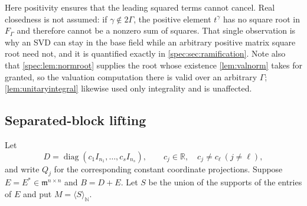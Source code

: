 \documentclass[11pt,a4paper]{article}
\numberwithin{equation}{section}
\theoremstyle{definition}
\theoremstyle{remark}
\newcommand{\R}{\mathbb R}
\newcommand{\N}{\mathbb N}
\newcommand{\mm}{\mathfrak m}
\newcommand{\diag}{\operatorname{diag}}
\begin{document}
Here positivity ensures that the leading squared terms cannot cancel.
Real closedness is not assumed: if $\gamma\notin2\Gamma$, the positive
element $t^\gamma$ has no square root in $F_\Gamma$ and therefore cannot be
a nonzero sum of squares. That single observation is why an SVD can stay in
the base field while an arbitrary positive matrix square root need not, and
it is quantified exactly in \cref{spec:sec:ramification}. Note also that
\cref{spec:lem:normroot} supplies the root whose existence
\cref{lem:valnorm} takes for granted, so the valuation computation there is
valid over an arbitrary $\Gamma$; \cref{lem:unitaryintegral} likewise used
only integrality and is unaffected.

\subsection{Separated-block lifting}

Let
\begin{equation}\label{spec:eq:D}
 D=\diag(c_1I_{n_1},\ldots,c_sI_{n_s}),\qquad
 c_j\in\R,\quad c_j\ne c_\ell\ (j\ne\ell),
\end{equation}
and write $Q_j$ for the corresponding constant coordinate projections.
Suppose $E=E^*\in\mm^{n\times n}$ and $B=D+E$. Let $S$ be the union of the
supports of the entries of $E$ and put $M=\langle S\rangle_\N$.
\end{document}

